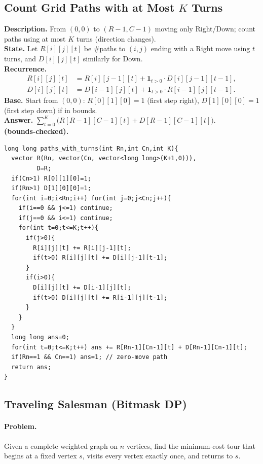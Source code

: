 \documentclass[9pt]{extarticle}
\begin{document}
\subsection{Count Grid Paths with at Most \(K\) Turns}
\textbf{Description.} From \((0,0)\) to \((R-1,C-1)\) moving only Right/Down; count paths using at most \(K\) turns (direction changes).  \\
\textbf{State.} Let \(R[i][j][t]\) be \#paths to \((i,j)\) ending with a Right move using \(t\) turns, and \(D[i][j][t]\) similarly for Down.\\  
\textbf{Recurrence.}
\[
\begin{aligned}
R[i][j][t] &= R[i][j-1][t] + \mathbf{1}_{t>0}\cdot D[i][j-1][t-1],\\
D[i][j][t] &= D[i-1][j][t] + \mathbf{1}_{t>0}\cdot R[i-1][j][t-1].
\end{aligned}
\]
\textbf{Base.} Start from \((0,0)\): \(R[0][1][0]=1\) (first step right), \(D[1][0][0]=1\) (first step down) if in bounds.  \\
\textbf{Answer.} \(\sum_{t=0}^K \big(R[R-1][C-1][t]+D[R-1][C-1][t]\big)\).  \\
\textbf{(bounds-checked).}
\begin{verbatim}
long long paths_with_turns(int Rn,int Cn,int K){
  vector R(Rn, vector(Cn, vector<long long>(K+1,0))),
         D=R;
  if(Cn>1) R[0][1][0]=1;
  if(Rn>1) D[1][0][0]=1;
  for(int i=0;i<Rn;i++) for(int j=0;j<Cn;j++){
    if(i==0 && j<=1) continue;
    if(j==0 && i<=1) continue;
    for(int t=0;t<=K;t++){
      if(j>0){
        R[i][j][t] += R[i][j-1][t];
        if(t>0) R[i][j][t] += D[i][j-1][t-1];
      }
      if(i>0){
        D[i][j][t] += D[i-1][j][t];
        if(t>0) D[i][j][t] += R[i-1][j][t-1];
      }
    }
  }
  long long ans=0;
  for(int t=0;t<=K;t++) ans += R[Rn-1][Cn-1][t] + D[Rn-1][Cn-1][t];
  if(Rn==1 && Cn==1) ans=1; // zero-move path
  return ans;
}
\end{verbatim}

\subsection{Traveling Salesman (Bitmask DP)}

\paragraph{Problem.}
Given a complete weighted graph on \(n\) vertices, find the minimum-cost tour
that begins at a fixed vertex \(s\), visits every vertex exactly once, and
returns to \(s\).
\end{document}
